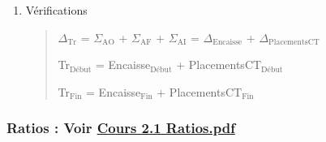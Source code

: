 \documentclass[11pt]{article}
\begin{document}
\begin{enumerate}
\begin{enumerate}
\item Vérifications
\label{sec:org3a9c411}
\begin{quote}
\(\Delta_{\text{Tr}}\) = \(\Sigma_{\text{AO}}\) + \(\Sigma_{\text{AF}}\) + \(\Sigma_{\text{AI}}\)
= \(\Delta_{\text{Encaisse}}\) + \(\Delta_{\text{PlacementsCT}}\)

Tr\(_{\text{Début}}\) = Encaisse\(_{\text{Début}}\) + PlacementsCT\(_{\text{Début}}\)

Tr\(_{\text{Fin}}\) = Encaisse\(_{\text{Fin}}\) + PlacementsCT\(_{\text{Fin}}\)
\end{quote}
\end{enumerate}
\end{enumerate}

\subsubsection{Ratios : Voir \href{https://moodle.polymtl.ca/pluginfile.php/512706/mod\_folder/content/0/Cours\%25202.1\%2520-\%2520Ratios.pdf?forcedownload=0}{Cours 2.1 Ratios.pdf}}
\label{sec:orgf1f3431}
\end{document}
